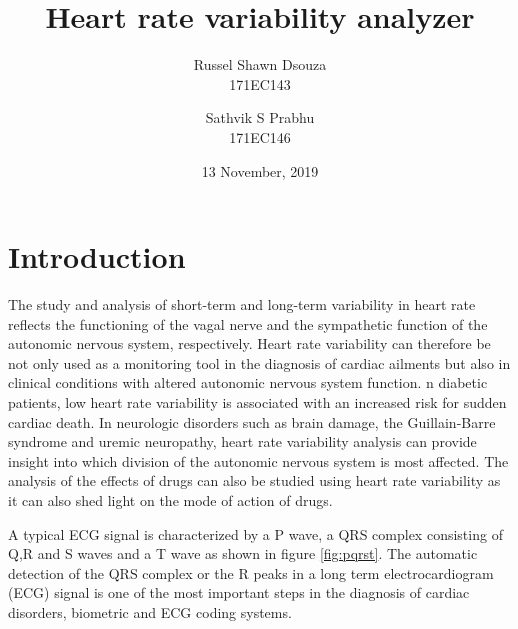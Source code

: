 \documentclass[11pt]{article}
\title{\textbf{Heart rate variability analyzer}}
\author{
  Russel Shawn Dsouza\\
  171EC143
  \and
  Sathvik S Prabhu\\
  171EC146
}
\date{13 November, 2019}
\theoremstyle{definition}
\begin{document}
  \maketitle
  \thispagestyle{empty}

  \newpage
  \tableofcontents
  \thispagestyle{empty}

  \setcounter{page}{1}
  \newpage
  \section{Introduction}

  
  The study and analysis of short-term and long-term variability in heart rate reflects the functioning of the vagal nerve and the sympathetic function of the autonomic nervous system, respectively.
  Heart rate variability can therefore be not only used as a monitoring tool in the diagnosis of cardiac ailments but also in clinical conditions with altered autonomic nervous system function.
  n diabetic patients, low heart rate variability is associated with an increased risk for sudden cardiac death.
  In neurologic disorders such as brain damage, the Guillain-Barre syndrome and uremic neuropathy, heart rate variability analysis can provide insight into which division of the autonomic nervous system is most affected.
  The analysis of the effects of drugs can also be studied using heart rate variability as it can also shed light on the mode of action of drugs.

  A typical ECG signal is characterized by a P wave, a QRS complex consisting of Q,R and S waves and a T wave as shown in figure \ref{fig:pqrst}.
  The automatic detection of the QRS complex or the R peaks in a long term electrocardiogram (ECG) signal is one of the most important steps in the diagnosis of cardiac disorders, biometric and ECG coding systems.
\end{document}

